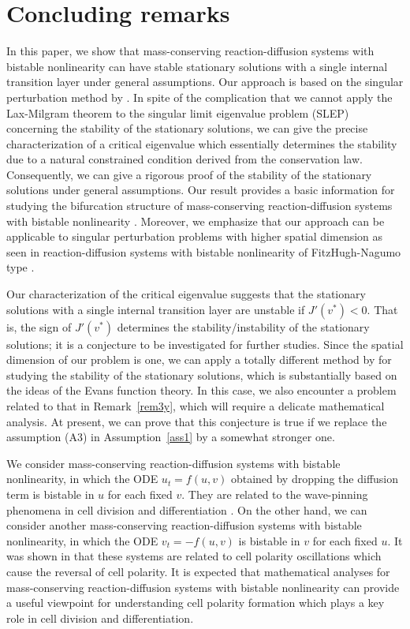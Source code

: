 \documentclass[a4,10pt]{article}
\begin{document}
\section{Concluding remarks} \label{conclude}

In this paper, we show that mass-conserving reaction-diffusion systems with 
bistable nonlinearity can have stable stationary solutions 
with a single internal transition layer under general assumptions.
Our approach is based on the singular perturbation method by \cite{HS, I, MTH, NF}.
In spite of the complication that we cannot apply 
the Lax-Milgram theorem to the singular limit eigenvalue problem (SLEP) concerning
the stability of the stationary solutions, 
we can give the precise characterization of a critical eigenvalue 
which essentially determines the stability 
due to a natural constrained condition derived from the conservation law.
Consequently, we can 
give a rigorous proof of the stability of the stationary solutions under general 
assumptions. 
Our result provides a basic information for studying the bifurcation structure of
mass-conserving reaction-diffusion systems with bistable nonlinearity
\cite{MKNTY, MJE2}.
Moreover, we emphasize that our approach can be applicable to singular perturbation problems with higher spatial dimension as seen in 
reaction-diffusion systems with bistable nonlinearity of FitzHugh-Nagumo 
type \cite{SS1, SS2}.

Our characterization of the critical eigenvalue suggests that the stationary solutions 
with a single internal transition layer are unstable if $J'(v^*) < 0$.
That is, the sign of $J'(v^*)$ determines
the stability/instability of the stationary solutions; 
it is a conjecture to be investigated for further studies.
Since the spatial dimension of our problem is one, 
we can apply a totally different method by \cite{I}
for studying the stability of the stationary solutions, which 
is substantially based on the ideas of the Evans function theory. In this case, 
we also encounter a problem related to that in Remark~\ref{rem3y}, which will require a delicate mathematical analysis. 
At present, we can prove that this conjecture is true if we replace the assumption (A3) 
in Assumption~\ref{ass1} by a somewhat stronger one.


We consider mass-conserving reaction-diffusion systems with bistable nonlinearity,
in which the ODE $u_t = f(u, v)$ 
obtained by dropping the diffusion term is bistable in $u$ for each fixed $v$. 
They are related to the wave-pinning phenomena in cell division and 
differentiation \cite{MJE1,MJE2}. 
On the other hand, 
we can consider another mass-conserving reaction-diffusion systems with bistable nonlinearity,
in which the ODE $v_t = - f(u, v)$ is bistable in $v$ for each fixed $u$. 
It was shown in \cite{KIE, OkS} that these systems are related to 
cell polarity oscillations which cause the reversal of cell polarity. 
It is expected that mathematical analyses for mass-conserving reaction-diffusion systems with 
bistable nonlinearity can provide a useful viewpoint for 
understanding cell polarity formation which plays a key role in cell division and differentiation.
\end{document}
